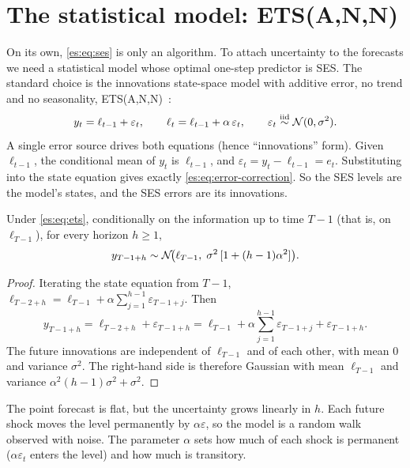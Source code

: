 \section{The statistical model: ETS(A,N,N)}

On its own, \eqref{es:eq:ses} is only an algorithm. To attach uncertainty to the
forecasts we need a statistical model whose optimal one-step predictor is SES.
The standard choice is the innovations state-space model with additive error,
no trend and no seasonality, ETS(A,N,N)~\cite{hyndman2008}:
\begin{equation}\label{es:eq:ets}
  y_t = \ell_{t-1} + \varepsilon_t,\qquad
  \ell_t = \ell_{t-1} + \alpha\,\varepsilon_t,\qquad
  \varepsilon_t \overset{\text{iid}}{\sim} \mathcal{N}(0,\sigma^2).
\end{equation}
A single error source drives both equations (hence ``innovations'' form).
Given $\ell_{t-1}$, the conditional mean of $y_t$ is $\ell_{t-1}$, and
$\varepsilon_t = y_t-\ell_{t-1} = e_t$. Substituting into the state equation gives
exactly \eqref{es:eq:error-correction}. So the SES levels are the model's
states, and the SES errors are its innovations.

\begin{theorem}\label{es:thm:forecast}
Under \eqref{es:eq:ets}, conditionally on the information up to time $T-1$
(that is, on $\ell_{T-1}$), for every horizon $h\ge 1$,
\[
  y_{T-1+h} \sim \mathcal{N}\!\big(\ell_{T-1},\; \sigma^2\,[1+(h-1)\alpha^2]\big).
\]
\end{theorem}
\begin{proof}
Iterating the state equation from $T-1$,
$\ell_{T-2+h} = \ell_{T-1} + \alpha\sum_{j=1}^{h-1}\varepsilon_{T-1+j}$. Then
\[
  y_{T-1+h} = \ell_{T-2+h} + \varepsilon_{T-1+h}
            = \ell_{T-1} + \alpha\sum_{j=1}^{h-1}\varepsilon_{T-1+j} + \varepsilon_{T-1+h}.
\]
The future innovations are independent of $\ell_{T-1}$ and of each other, with
mean $0$ and variance $\sigma^2$. The right-hand side is therefore Gaussian with mean
$\ell_{T-1}$ and variance $\alpha^2(h-1)\sigma^2+\sigma^2$.
\end{proof}

The point forecast is flat, but the uncertainty grows linearly in $h$. Each
future shock moves the level permanently by $\alpha\varepsilon$, so the model is a random walk observed with noise.
The parameter $\alpha$ sets how much of each shock is
permanent ($\alpha\varepsilon_t$ enters the level) and how much is transitory.

